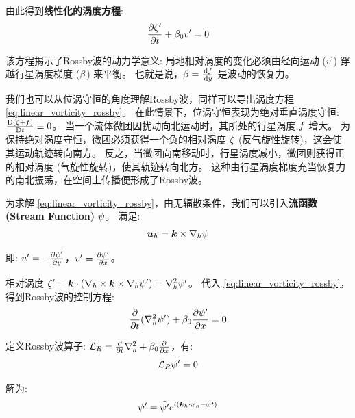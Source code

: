 由此得到\textbf{线性化的涡度方程}:
\begin{equation}
    \pde{\relvort^\prime}{\timevar} + \rossby_0 v^\prime = 0
    \label{eq:linear_vorticity_rossby}
\end{equation}

该方程揭示了Rossby波的动力学意义: 局地相对涡度的变化必须由经向运动 ($v^\prime$) 穿越行星涡度梯度 ($\beta$) 来平衡。
也就是说，$\rossby = \ode{\coriolis}{y}$ 是波动的恢复力。

\begin{insightbox}[Rossby波的物理图景]
    我们也可以从位涡守恒的角度理解Rossby波，同样可以导出涡度方程 \eqref{eq:linear_vorticity_rossby}。
    在此情景下，位涡守恒表现为绝对垂直涡度守恒: $\frac{\mathrm{D} (\zeta + f)}{\mathrm{D} t} \equiv 0$。
    当一个流体微团因扰动向北运动时，其所处的行星涡度 $f$ 增大。
    为保持绝对涡度守恒，微团必须获得一个负的相对涡度 $\zeta$ (反气旋性旋转)，这会使其运动轨迹转向南方。
    反之，当微团向南移动时，行星涡度减小，微团则获得正的相对涡度 (气旋性旋转)，使其轨迹转向北方。
    这种由行星涡度梯度充当恢复力的南北振荡，在空间上传播便形成了Rossby波。
\end{insightbox}

为求解 \eqref{eq:linear_vorticity_rossby}，由无辐散条件，我们可以引入\textbf{流函数 (Stream Function)} $\psi$。
满足:
\begin{equation}
    \bm{u}_h = \bm{k} \times \nabla_h \psi
    \label{eq:stream_function}
\end{equation}

即: $u^\prime = -\pde{\streamfunc^\prime}{y}$，$v^\prime = \pde{\streamfunc^\prime}{x}$。

相对涡度 $\zeta^\prime = \bm{k} \cdot (\nabla_h \times \bm{k} \times \nabla_h \psi^\prime) = \nabla_h^2 \psi^\prime$。
代入 \eqref{eq:linear_vorticity_rossby}，得到Rossby波的控制方程:
\begin{equation*}
    \pde{}{\timevar} (\nabla_h^2 \streamfunc^\prime) + \rossby_0 \pde{\streamfunc^\prime}{x} = 0
\end{equation*}

定义Rossby波算子: $\opR = \pde{}{\timevar} \nabla_h^2 + \rossby_0 \pde{}{x}$，有:
\begin{equation}
    \mathcal{L}_R \psi^\prime = 0
    \label{eq:wave_equation_rossby}
\end{equation}

解为:
\begin{equation}
    \psi^\prime = \widehat{\psi^\prime} e^{i (\bm{k}_h \cdot \bm{x}_h - \omega t)}
    \label{eq:wave_solution_rossby}
\end{equation}

